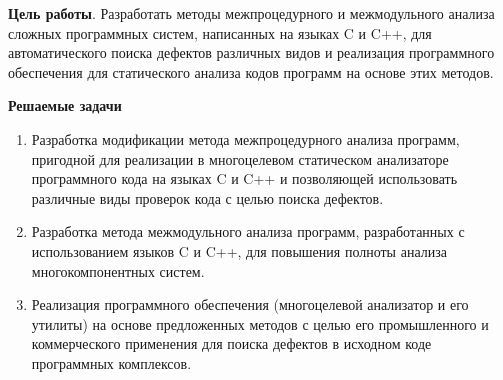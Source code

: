 \documentclass[hyperref={pdfpagelabels=false},10pt,gray]{beamer}
\begin{document}
\begin{frame}
\textbf{\Large{Цель работы}}. Разработать методы межпроцедурного и межмодульного анализа сложных программных систем, написанных на языках C и C++, для автоматического поиска дефектов различных видов и реализация программного обеспечения для статического анализа кодов программ на основе этих методов.

\vspace{5pt}
\textbf{\Large{Решаемые задачи}}

\begin{enumerate}
  \item Разработка модификации метода межпроцедурного анализа программ, пригодной для реализации в многоцелевом статическом анализаторе программного кода на языках C и C++ и позволяющей использовать различные виды проверок кода с целью поиска дефектов.
  \item Разработка метода межмодульного анализа программ, разработанных с использованием языков C и C++, для повышения полноты анализа многокомпонентных систем.
  \item Реализация программного обеспечения (многоцелевой анализатор и его утилиты) на основе предложенных методов с целью его промышленного и коммерческого применения для поиска дефектов в исходном коде программных комплексов.
\end{enumerate}

\end{frame}

\end{document}

